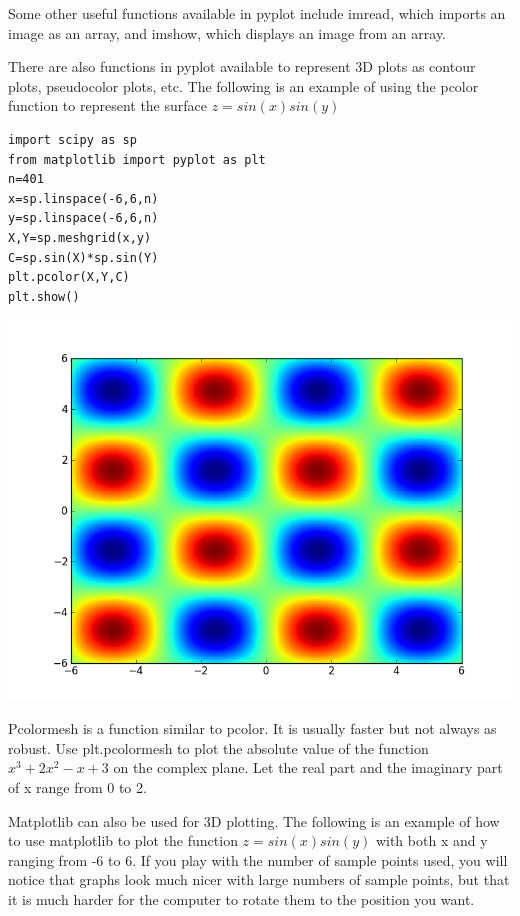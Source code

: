 Some other useful functions available in pyplot include imread, which imports an image as an array, and imshow, which displays an image from an array.

There are also functions in pyplot available to represent 3D plots as contour plots, pseudocolor plots, etc.
The following is an example of using the pcolor function to represent the surface $z=sin(x)sin(y)$
\begin{lstlisting}
import scipy as sp
from matplotlib import pyplot as plt
n=401
x=sp.linspace(-6,6,n)
y=sp.linspace(-6,6,n)
X,Y=sp.meshgrid(x,y)
C=sp.sin(X)*sp.sin(Y)
plt.pcolor(X,Y,C)
plt.show()
\end{lstlisting}

\includegraphics[width=\textwidth]{pcolor.png}

\begin{problem}
Pcolormesh is a function similar to pcolor. It is usually faster but not always as robust.
Use plt.pcolormesh to plot the absolute value of the function $x^3 +2x^2 -x +3$ on the complex plane. Let the real part and the imaginary part of x range from 0 to 2.
\end{problem}

Matplotlib can also be used for 3D plotting. The following is an example of how to use matplotlib to plot the function $z=sin(x)sin(y)$ with both x and y ranging from -6 to 6. If you play with the number of sample points used, you will notice that graphs look much nicer with large numbers of sample points, but that it is much harder for the computer to rotate them to the position you want.

